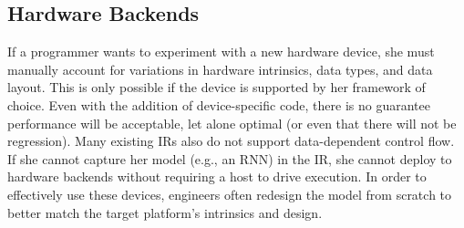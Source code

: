 \subsection{Hardware Backends}

If a programmer wants to experiment with a new hardware device,
  she must manually account for variations in hardware intrinsics, data
  types, and data layout.
This is only possible if the device is supported by her framework of choice.
Even with the addition of device-specific code,
  there is no guarantee performance will be acceptable, let alone optimal
  (or even that there will not be regression).
Many existing IRs also do not support data-dependent control flow.
If she cannot capture her model (e.g., an RNN) in the IR,
  she cannot deploy to hardware backends without requiring a host to drive
  execution.
In order to effectively use these devices,
  engineers often redesign the model from scratch to better match the target
  platform's intrinsics and design.






